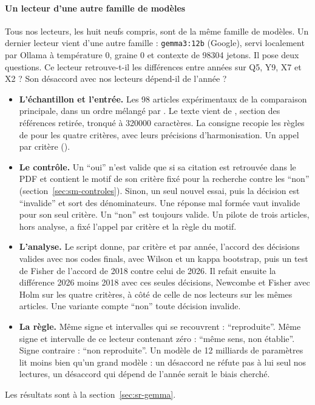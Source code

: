 \paragraph{Un lecteur d'une autre famille de modèles}\label{sec:sm-gemma}
Tous nos lecteurs, les huit neufs compris, sont de la même famille de modèles. Un dernier lecteur vient
d'une autre famille : \texttt{gemma3:12b}
(Google), servi localement par Ollama à température 0, graine 0 et contexte de \num{98304} jetons. Il
pose deux questions. Ce lecteur retrouve-t-il les différences entre années sur Q5, Y9, X7 et X2 ?
Son désaccord avec nos lecteurs dépend-il de l'année ?
\begin{itemize}
  \item \textbf{L'échantillon et l'entrée.} Les 98 articles expérimentaux de la comparaison
  principale, dans un ordre mélangé par . Le texte vient de
  , section des références retirée, tronqué à \num{320000} caractères. La consigne
  recopie les règles de  pour les quatre critères, avec leurs précisions
  d'harmonisation. Un appel par critère ().
  \item \textbf{Le contrôle.} Un \enquote{oui} n'est valide que si sa citation est retrouvée dans le
  PDF et contient le motif de son critère fixé pour la recherche contre les \enquote{non}
  (section~\ref{sec:sm-controles}). Sinon, un seul nouvel essai, puis la décision est \enquote{invalide} et sort des
  dénominateurs. Une réponse mal formée vaut invalide pour son seul critère. Un \enquote{non} est
  toujours valide. Un pilote de trois articles, hors analyse, a fixé l'appel par critère et la règle
  du motif.
  \item \textbf{L'analyse.} Le script  donne, par critère et par année,
  l'accord des décisions valides avec nos codes finals, avec Wilson et un kappa bootstrap, puis un
  test de Fisher de l'accord de 2018 contre celui de 2026. Il refait ensuite la différence 2026 moins
  2018 avec ces seules décisions, Newcombe et Fisher avec Holm sur les quatre critères, à côté de celle
  de nos lecteurs sur les mêmes articles. Une variante compte \enquote{non} toute décision
  invalide.
  \item \textbf{La règle.} Même signe et intervalles qui se recouvrent :
  \enquote{reproduite}. Même signe et intervalle de ce lecteur contenant zéro : \enquote{même sens,
  non établie}. Signe contraire : \enquote{non reproduite}. Un modèle de 12 milliards de paramètres
  lit moins bien qu'un grand modèle : un désaccord ne réfute pas à lui seul nos
  lectures, un désaccord qui dépend de l'année serait le biais cherché.
\end{itemize}
Les résultats sont à la section~\ref{sec:sr-gemma}.

